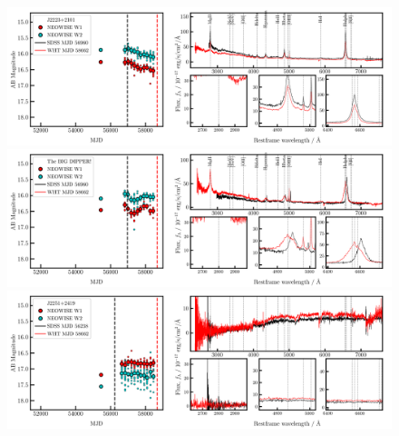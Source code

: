 \documentclass[a4paper,fleqn,usenatbib]{mnras}
\begin{document}
\begin{figure}
  \centering
  \includegraphics[width=16.7cm, trim=0.0cm 0.05cm 0.2cm 0.1cm, clip]
  {../plots/LCs_and_spectra/J2223+2101_landscape_temp.png}
  \includegraphics[width=16.7cm, trim=0.0cm 0.05cm 0.2cm 0.1cm, clip]
  {../plots/LCs_and_spectra/J2232-0806_landscape_temp.png}
  \includegraphics[width=16.7cm, trim=0.0cm 0.05cm 0.2cm 0.1cm, clip]
  {../plots/LCs_and_spectra/J2251+2419_landscape_temp.png}
    \vspace{-12pt}
  \caption[]{}
  \label{fig:all_spectra_e}
\end{figure}
\end{document}
